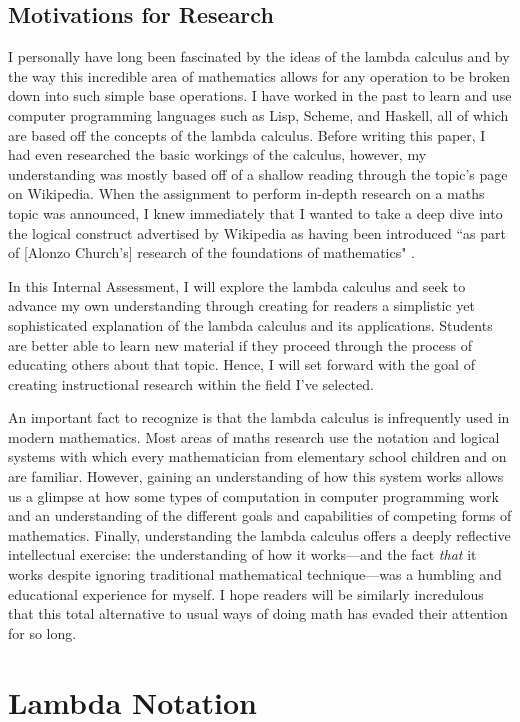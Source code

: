 \documentclass[twocolumn,titlepage,12pt]{article}
\begin{document}
\subsection{Motivations for Research}
I personally have long been fascinated by the ideas of the lambda calculus and by the way this incredible area of mathematics allows for any operation to be broken down into such simple base operations. I have worked in the past to learn and use computer programming languages such as Lisp, Scheme, and Haskell, all of which are based off the concepts of the lambda calculus. Before writing this paper, I had even researched the basic workings of the calculus, however, my understanding was mostly based off of a shallow reading through the topic's page on Wikipedia. When the assignment to perform in-depth research on a maths topic was announced, I knew immediately that I wanted to take a deep dive into the logical construct advertised by Wikipedia as having been introduced ``as part of [Alonzo Church's] research of the foundations of mathematics" \cite{wikipedialc}.

In this Internal Assessment, I will explore the lambda calculus and seek to advance my own understanding through creating for readers a simplistic yet sophisticated explanation of the lambda calculus and its applications. Students are better able to learn new material if they proceed through the process of educating others about that topic. Hence, I will set forward with the goal of creating instructional research within the field I've selected.

An important fact to recognize is that the lambda calculus is infrequently used in modern mathematics. Most areas of maths research use the notation and logical systems with which every mathematician from elementary school children and on are familiar. However, gaining an understanding of how this system works allows us a glimpse at how some types of computation in computer programming work and an understanding of the different goals and capabilities of competing forms of mathematics. Finally, understanding the lambda calculus offers a deeply reflective intellectual exercise: the understanding of how it works---and the fact \textit{that} it works despite ignoring traditional mathematical technique---was a humbling and educational experience for myself. I hope readers will be similarly incredulous that this total alternative to usual ways of doing math has evaded their attention for so long.

\section{Lambda Notation}
\end{document}
